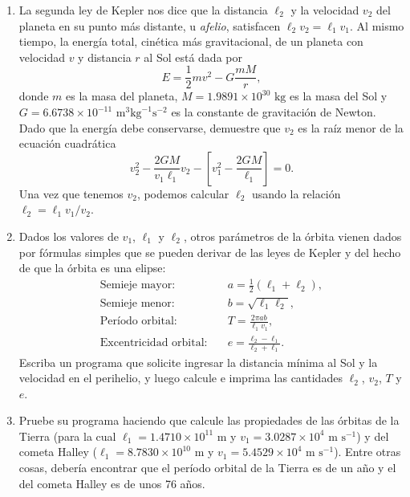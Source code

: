 \documentclass[12pt]{article}
\begin{document}
\begin{problemas}[]
\begin{enumerate}[leftmargin=*]
\begin{enumerate}[label=\alph*)]
    \item La segunda ley de Kepler nos dice que la distancia $\ell_2$ y la velocidad $v_2$ del planeta en su punto más distante, u \textit{afelio}, satisfacen $\ell_2 v_2 = \ell_1 v_1$. Al mismo tiempo, la energía total, cinética más gravitacional, de un planeta con velocidad $v$ y distancia $r$ al Sol está dada por
    \begin{equation*}
        E = \frac{1}{2} m v^2 - G \frac{m M}{r},
    \end{equation*}
    donde $m$ es la masa del planeta, $M = 1.9891 \times 10^{30} \text{ kg}$ es la masa del Sol y $G = 6.6738 \times 10^{-11} \text{ m}^3 \text{kg}^{-1} \text{s}^{-2}$ es la constante de gravitación de Newton. Dado que la energía debe conservarse, demuestre que $v_2$ es la raíz menor de la ecuación cuadrática
    \begin{equation*}
        v_2^2 - \frac{2 G M}{v_1 \ell_1} v_2 - \left[ v_1^2 - \frac{2 G M}{\ell_1} \right] = 0.
    \end{equation*}
    Una vez que tenemos $v_2$, podemos calcular $\ell_2$ usando la relación $\ell_2 = \ell_1 v_1 / v_2$.

    \item Dados los valores de $v_1$, $\ell_1$ y $\ell_2$, otros parámetros de la órbita vienen dados por fórmulas simples que se pueden derivar de las leyes de Kepler y del hecho de que la órbita es una elipse:
    \begin{align*}
        \text{Semieje mayor:} \quad & a = \frac{1}{2} (\ell_1 + \ell_2), \\
        \text{Semieje menor:} \quad & b = \sqrt{\ell_1 \ell_2}, \\
        \text{Período orbital:} \quad & T = \frac{2 \pi a b}{\ell_1 v_1}, \\
        \text{Excentricidad orbital:} \quad & e = \frac{\ell_2 - \ell_1}{\ell_2 + \ell_1}.
    \end{align*}
    Escriba un programa que solicite ingresar la distancia mínima al Sol 
    y la velocidad en el perihelio, y luego calcule e imprima las cantidades
     $\ell_2$, $v_2$, $T$ y $e$.

    \item Pruebe su programa haciendo que calcule las propiedades de las órbitas de la Tierra 
    (para la cual $\ell_1 = 1.4710 \times 10^{11} \text{ m}$ y
    $v_1 = 3.0287 \times 10^4 \text{ m s}^{-1}$) y del cometa 
    Halley ($\ell_1 = 8.7830 \times 10^{10} \text{ m}$ y $v_1 = 5.4529 \times 10^4 \text{ m s}^{-1}$). 
    Entre otras cosas, debería encontrar que el período orbital de la Tierra es de un año y el del 
    cometa Halley es de unos 76 años.
\end{enumerate}


\end{enumerate}
\end{problemas}
\end{document}
